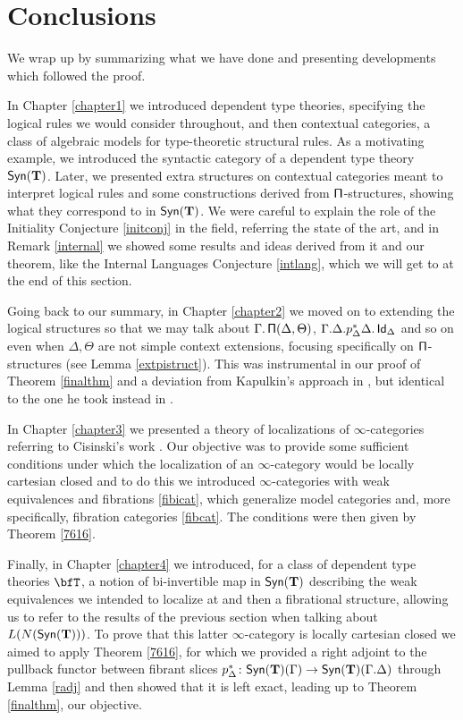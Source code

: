 \section{Conclusions}

We wrap up by summarizing what we have done and presenting developments which
followed the proof.

In Chapter \ref{chapter1} we introduced dependent type theories, specifying the
logical rules we would consider throughout, and then contextual categories, a
class of algebraic models for type-theoretic structural rules. As a motivating
example, we introduced the syntactic category of a dependent type theory
$\mathsf{Syn}(\mathbf{T})$. Later, we presented extra structures on contextual categories meant
to interpret logical rules and some constructions derived from
$\operatorname{\mathsf{\Pi}}$-structures, showing what they correspond to in $\mathsf{Syn}(\mathbf{T})$. We were careful
to explain the role of the Initiality Conjecture \ref{initconj} in the field,
referring the state of the art, and
in Remark \ref{internal} we showed some results and ideas derived from it and our
theorem, like the Internal Languages Conjecture \ref{intlang}, which we will
get to at the end of this section.

Going back to our summary, in Chapter \ref{chapter2} we moved on to extending
the logical structures so that we may talk about $\Gamma.\operatorname{\mathsf{\Pi}}(\Delta,\Theta)$,
$\Gamma.\Delta.p^*_\Delta\Delta.\operatorname{\mathsf{Id}}_\Delta$ and so on even when $\Delta,\Theta$
are not simple context extensions, focusing specifically on $\operatorname{\mathsf{\Pi}}$-structures
(see Lemma \ref{extpistruct}). This was instrumental in our proof of Theorem
\ref{finalthm} and a deviation from Kapulkin's approach in \cite{Kap14}, but
identical to the one he took instead in \cite{Kap17}.

In Chapter \ref{chapter3} we presented a theory of localizations of
$\infty$-categories referring to Cisinski's work \cite{Cis19}. Our objective was
to provide some sufficient conditions under which the localization of an
$\infty$-category would be locally cartesian closed and to do this we introduced
$\infty$-categories with weak equivalences and fibrations \ref{fibicat}, which
generalize model categories and, more specifically, fibration categories
\ref{fibcat}. The conditions were then given by Theorem \ref{7616}.

Finally, in Chapter \ref{chapter4} we introduced, for a class of dependent type
theories $\bfT$, a notion of bi-invertible map in $\mathsf{Syn}(\mathbf{T})$ describing the weak
equivalences we intended to localize at and then a fibrational structure,
allowing us to refer to the results of the previous section when talking about
$L(N(\mathsf{Syn}(\mathbf{T})))$. To prove that this latter $\infty$-category is locally
cartesian closed we aimed to apply Theorem \ref{7616}, for which
we provided a right adjoint to the pullback functor between fibrant
slices $p^*_\Delta\colon\mathsf{Syn}(\mathbf{T})(\Gamma)\rightarrow\mathsf{Syn}(\mathbf{T})(\Gamma.\Delta)$
through Lemma \ref{radj} and then showed that it is left exact, leading up to
Theorem \ref{finalthm}, our objective.

